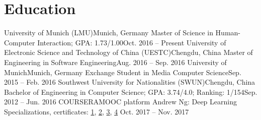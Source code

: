 \section{\textbf{Education}}
  \resumeSubHeadingListStart
    \resumeSubheading
      {University of Munich (LMU)}{Munich, Germany}
      {Master of Science in Human-Computer Interaction; GPA: 1.73/1.00}{Oct. 2016 -- Present}
    \resumeSubheading
      {University of Electronic Science and Technology of China (UESTC)}{Chengdu, China}
      {Master of Engineering in Software Engineering}{Aug. 2016 -- Sep. 2016}
    \resumeSubheading
      {University of Munich}{Munich, Germany}
      {Exchange Student in Media Computer Science}{Sep. 2015 -- Feb. 2016}
    \resumeSubheading
      {Southwest University for Nationalities (SWUN)}{Chengdu, China}
      {Bachelor of Engineering in Computer Science;  GPA: 3.74/4.0; Ranking: 1/154}{Sep. 2012 -- Jun. 2016}
    \resumeSubheading
      {COURSERA}{MOOC platform}
      {Andrew Ng: Deep Learning Specializations, certificates:
       \href{https://www.coursera.org/account/accomplishments/verify/YH4NT7HHN263}{1}, 
       \href{https://www.coursera.org/account/accomplishments/verify/QGH3GNGF6BM4}{2}, 
       \href{https://www.coursera.org/account/accomplishments/verify/6VU45R2SZEF6}{3},
       \href{https://www.coursera.org/account/accomplishments/verify/LF3K9BQQDLVL}{4}}
      {Oct. 2017 -- Nov. 2017}
  \resumeSubHeadingListEnd